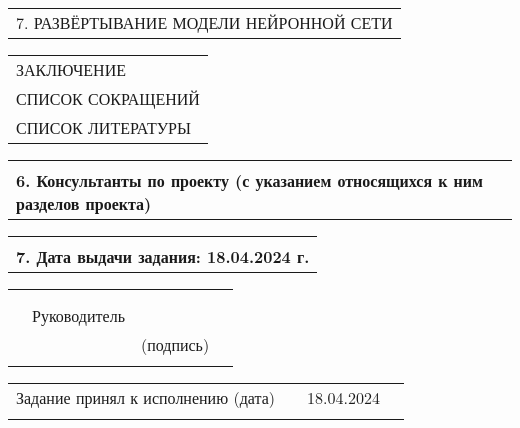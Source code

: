 \documentclass[12pt, А4, twoside]{article} %
\begin{document}
\begin{FlushLeft}
    \begin{tabular}{p{17.25cm}} 
        \hspace{0.3cm} \textsf{7. РАЗВЁРТЫВАНИЕ МОДЕЛИ НЕЙРОННОЙ СЕТИ} \vspace{1pt} \hline \\
    \end{tabular}  

    \begin{tabular}{p{17.25cm}} 
        \textsf{ЗАКЛЮЧЕНИЕ} \vspace{2pt} \hline \\
        \textsf{СПИСОК СОКРАЩЕНИЙ} \vspace{1pt} \hline \\
        \textsf{СПИСОК ЛИТЕРАТУРЫ} \vspace{2pt} \hline 
    \end{tabular} 

    \begin{tabular}{p{17.25cm}} 
        \vspace{1pt} \hline  \\
        \textsf{\textbf{6. Консультанты по проекту (с указанием относящихся к ним разделов проекта)}} \vspace{1pt} \hline \\
    \end{tabular}   

    \begin{tabular}{p{17.25cm}} 
        \vspace{1pt} \hline  \\
        \textsf{\textbf{7. Дата выдачи задания: 18.04.2024 г.}} \vspace{1pt} \hline \\
    \end{tabular} 

    \begin{tabular}{p{4.2cm} p{3.8cm} p{6.0cm} p{2.0cm}} 
        & & & 
        \\ 
        & & & 
        \\
        & \fontsize{14}{17.5} \textrm{Руководитель} & 
        \vspace{1pt} \hline & 
        \\ 
        & & \centering \fontsize{12}{15} \textsf{(подпись)} & 
        \\ 
        & & &
    \end{tabular} 

\fontsize{12}{15}

    \begin{tabular}{p{7.5cm} p{0.5cm} p{6.0cm} p{2.0cm}} %
        \textsf{Задание принял к исполнению (дата)} & &
        \centering \textsf{18.04.2024} \vspace{1pt} \hline & 
        \\ %
        & & & %
    \end{tabular} %


\end{FlushLeft}
\end{document}
